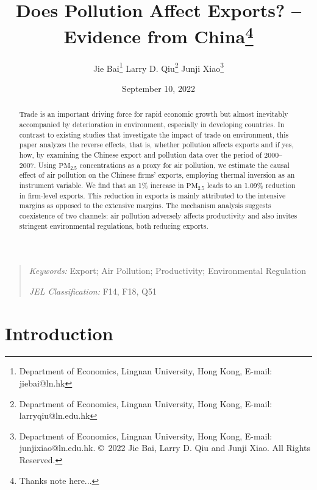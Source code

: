 \documentclass[12pt]{article}
\begin{document}
\title{Does Pollution Affect Exports? -- Evidence from China\thanks{%
Thanks note here...}}
\author{Jie Bai\thanks{%
Department of Economics, Lingnan University, Hong Kong, E-mail: jiebai@ln.hk}
\quad Larry D. Qiu\thanks{%
Department of Economics, Lingnan University, Hong Kong, E-mail:
larryqiu@ln.edu.hk} \quad Junji Xiao\thanks{%
Department of Economics, Lingnan University, Hong Kong, E-mail:
junjixiao@ln.edu.hk. \copyright\ 2022 Jie Bai, Larry D. Qiu and Junji Xiao.
All Rights Reserved. }}
\date{September 10, 2022}
\maketitle

\begin{abstract}
Trade is an important driving force for rapid economic growth but almost
inevitably accompanied by deterioration in environment, especially in
developing countries. In contrast to existing studies that investigate the
impact of trade on environment, this paper analyzes the reverse effects,
that is, whether pollution affects exports and if yes, how, by examining the
Chinese export and pollution data over the period of 2000--2007. Using $%
\mathrm{PM_{2.5}}$ concentrations as a proxy for air pollution, we estimate
the causal effect of air pollution on the Chinese firms' exports, employing
thermal inversion as an instrument variable. We find that an 1\% increase in 
$\mathrm{PM_{2.5}}$ leads to an 1.09\% reduction in firm-level exports. This
reduction in exports is mainly attributed to the intensive margins as
opposed to the extensive margins. The mechanism analysis suggests
coexistence of two channels: air pollution adversely affects productivity
and also invites stringent environmental regulations, both reducing exports.
\end{abstract}

\thispagestyle{empty}

\begin{quote}
\emph{Keywords:} Export; Air Pollution; Productivity; Environmental
Regulation

\emph{JEL Classification:} F14, F18, Q51
\end{quote}

\newpage \setcounter{page}{1}

\section{Introduction}
\end{document}
